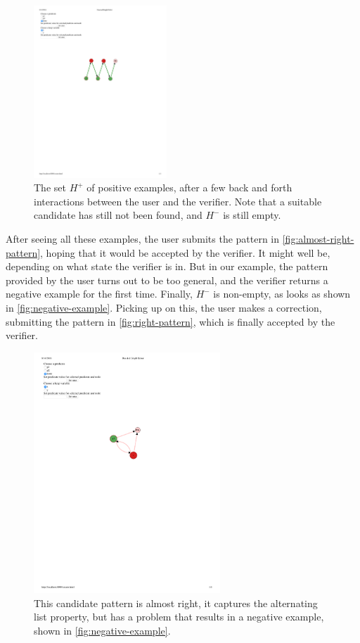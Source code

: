 \begin{figure}
  \includegraphics[width=5cm]{fig/positive5.pdf}
  \caption{The set $H^{+}$ of positive examples, after a few back and forth interactions between the user and the verifier. Note that a suitable candidate has still not been found, and $H^{-}$ is still empty.}
  \label{fig:several-positive-examples}
\end{figure}

After seeing all these examples, the user submits the pattern in \autoref{fig:almost-right-pattern}, hoping that it would be accepted by the verifier. It might well be, depending on what state the verifier is in. But in our example, the pattern provided by the user turns out to be too general, and the verifier returns a negative example for the first time. Finally, $H^{-}$ is non-empty, as looks as shown in \autoref{fig:negative-example}. Picking up on this, the user makes a correction, submitting the pattern in \autoref{fig:right-pattern}, which is finally accepted by the verifier.

\begin{figure}
  \centering
  \includegraphics[width=7cm]{fig/candidate5.pdf}
  \caption{This candidate pattern is almost right, it captures the alternating list property, but has a problem that results in a negative example, shown in \autoref{fig:negative-example}.}
  \label{fig:almost-right-pattern}
\end{figure}

